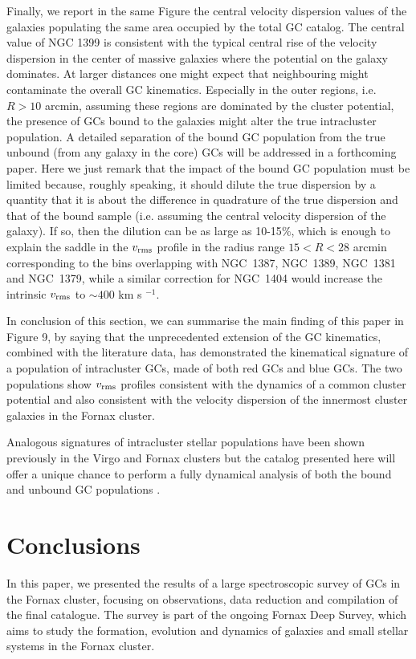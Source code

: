 \documentclass[useAMS,usenatbib]{mn2e}
\begin{document}
Finally, we report in the same Figure the central velocity dispersion values of the galaxies populating the same area occupied by the total GC catalog. The central value of NGC 1399 is consistent with the typical central rise of the velocity dispersion in the center of massive galaxies where the potential on the galaxy dominates. At larger distances one might expect that neighbouring might contaminate the overall GC kinematics. Especially in the outer regions, i.e. $R>10$ arcmin, assuming these regions are dominated by the cluster potential, the presence of GCs bound to the galaxies might alter the true  intracluster population. A detailed separation of the bound GC population from the true unbound (from any galaxy in the core) GCs will be addressed in a forthcoming paper. Here we just remark that the impact of the bound GC population must be limited because, roughly speaking, it should dilute the true dispersion by a quantity that it is about the difference in quadrature of the true dispersion and that of the bound sample (i.e. assuming the central velocity dispersion of the galaxy). If so, then the dilution can be as large as 10-15$\%$, which is enough to explain the saddle in the  $v_{\rm rms}$ profile in the radius range $15<R<28$ arcmin corresponding to the bins overlapping with NGC~1387, NGC~1389, NGC~1381 and NGC~1379, while a similar correction for NGC~1404 would increase the intrinsic $v_{\rm rms}$ to $\sim400$ km s $^{-1}$.

In conclusion of this section, we can summarise the main finding of this paper in Figure 9, by saying that the unprecedented extension of the GC kinematics, combined with the literature data, has demonstrated the kinematical signature of a population of intracluster GCs, made of both red GCs and blue GCs. The two populations show $v_{\rm rms}$ profiles consistent with the dynamics of a common cluster potential and also consistent with the velocity dispersion of the innermost cluster galaxies in the Fornax cluster. 

Analogous signatures of intracluster stellar populations have been shown previously in the Virgo and Fornax clusters \citep[see e.g., ][]{Arnaboldi04, Longobardi15, Paolillo02} but the catalog presented here will offer a unique chance to perform a fully dynamical analysis of both the bound and unbound GC populations \citep{DAbrusco16}.

\section{Conclusions}
\label{sec:conclusions}
In this paper, we presented the results of a large  spectroscopic survey of GCs in the Fornax cluster, focusing on observations, data reduction and compilation of the final catalogue. The survey is part of the ongoing Fornax Deep Survey, which aims to study the formation, evolution and dynamics of galaxies and small stellar systems in the Fornax cluster.
\end{document}
